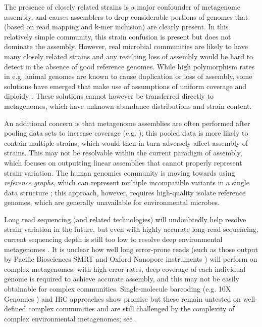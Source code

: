 \documentclass[11pt]{article}
\begin{document}
The presence of closely related strains is a major confounder of
metagenome assembly, and causes assemblers to drop considerable
portions of genomes that (based on read mapping and k-mer inclusion)
are clearly present.  In this relatively simple community, this strain
confusion is present but does not dominate the assembly.  However,
real microbial communities are likely to have many closely related
strains and any resulting loss of assembly would be hard to detect in
the absence of good reference genomes.  While high polymorphism rates
in e.g. animal genomes are known to cause duplication or loss of
assembly, some solutions have emerged that make use of assumptions of
uniform coverage and diploidy \cite{Kim2007}.  These solutions cannot
however be transferred directly to metagenomes, which have unknown
abundance distributions and strain content.

An additional concern is that metagenome assemblies are often
performed after pooling data sets to increase coverage
(e.g. \cite{Sharon2012,Hu2016}); this pooled data is more likely to
contain multiple strains, which would then in turn adversely affect
assembly of strains.  This may not be resolvable within the current
paradigm of assembly, which focuses on outputting linear assemblies
that cannot properly represent strain variation.  The human genomics
community is moving towards using {\em reference graphs}, which can
represent multiple incompatible variants in a single data structure
\cite{paten2017genome}; this approach, however, requires high-quality
isolate reference genomes, which are generally unavailable for
environmental microbes.

Long read sequencing (and related technologies) will undoubtedly help
resolve strain variation in the future, but even with highly accurate
long-read sequencing, current sequencing depth is still too low to
resolve deep environmental metagenomes \cite{Sharon2015,White2016}.
It is unclear how well long error-prone reads (such as those output by
Pacific Biosciences SMRT \cite{Eid2009} and Oxford Nanopore
instruments \cite{Cherf2012}) will perform on complex metagenomes:
with high error rates, deep coverage of each individual genome is
required to achieve accurate assembly, and this may not be easily
obtainable for complex communities.  Single-molecule barcoding
(e.g. 10X Genomics \cite{Moss125211}) and HiC approaches
\cite{SmukowskiHeil150722} show promise but these remain untested on
well-defined complex communities and are still challenged by the
complexity of complex environmental metagenomes; see
\cite{Burton2014,Marbouty2014,Beitel2014}.
\end{document}
